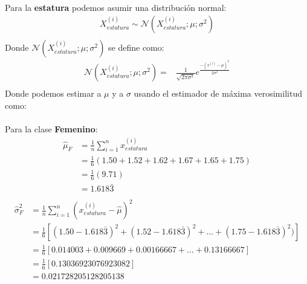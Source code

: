 \documentclass[12pt]{article}
\begin{document}
  \paragraph{}Para la \textbf{estatura} podemos asumir una distribución normal:
  \begin{equation}
  \begin{split}
  X_{estatura}^{(i)}\sim \mathcal{N}(X_{estatura}^{(i)};\mu;\sigma^2)\\
  \end{split}
  \end{equation}
  Donde $\mathcal{N}(X_{estatura}^{(i)};\mu;\sigma^2)$ se define como:\\
  \begin{equation}
  \begin{split}
  \mathcal{N}(X_{estatura}^{(i)};\mu;\sigma^2) =& \frac{1}{\sqrt{2\pi\sigma^2}}e^{\frac{-(x^{(i)} - \mu)^2}{2\sigma^2}}\\
  \end{split}
  \end{equation}
  Donde podemos estimar a $\mu$ y a $\sigma$ usando el estimador de máxima verosimilitud como:
  \paragraph{} Para la clase \textbf{Femenino}:
  \begin{equation}
  \begin{split}
  \hat{\mu}_{F}&=\frac{1}{n}\sum_{i=1}^{n}{x_{estatura}^{(i)}}\\
  &=\frac{1}{6}(1.50 + 1.52 + 1.62 + 1.67 + 1.65 + 1.75)\\
   &=\frac{1}{6}(9.71)\\
   &= 1.618\bar{3}\\
  \end{split}
  \end{equation}
  \begin{equation}
  \begin{split}
  \hat{\sigma}^2_F&=\frac{1}{n}\sum_{i=1}^{n}{(x_{estatura}^{(i)} - \hat{\mu})^2}\\
  &=\frac{1}{6}[(1.50-1.618\bar{3})^2 + (1.52-1.618\bar{3})^2  + \dots + (1.75-1.618\bar{3})^2)]\\
  &=\frac{1}{6}[0.014003 + 0.009669 + 0.00166667 + \dots + 0.13166667]\\
  &=\frac{1}{6}[0.13036923076923082]\\
  &= 0.021728205128205138\\
  \end{split}
  \end{equation}
\end{document}
